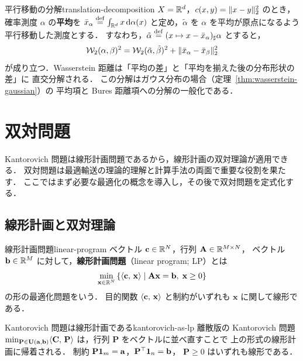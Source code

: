 \begin{remark}{平行移動の分解}{translation-decomposition}
  $X = \mathbb{R}^d$，$c(x,y) = \lVert x - y \rVert_2^2$ のとき，
  確率測度 $\alpha$ の\textbf{平均}を
  $\bar{x}_\alpha \overset{\mathrm{def}}{=} \int_{\mathbb{R}^d} x \, \mathrm{d}\alpha(x)$
  と定め，$\tilde{\alpha}$ を $\alpha$ を平均が原点になるよう平行移動した測度とする．
  すなわち，$\tilde{\alpha} \overset{\mathrm{def}}{=} (x \mapsto x - \bar{x}_\alpha)_\sharp \alpha$ とすると，
  \[
    \mathcal{W}_2(\alpha, \beta)^2
    = \mathcal{W}_2(\tilde{\alpha}, \tilde{\beta})^2
    + \lVert \bar{x}_\alpha - \bar{x}_\beta \rVert_2^2
  \]
  が成り立つ．Wasserstein 距離は「平均の差」と「平均を揃えた後の分布形状の差」に
  直交分解される．
  この分解はガウス分布の場合（定理~\ref{thm:wasserstein-gaussian}）の
  平均項と Bures 距離項への分解の一般化である．
\end{remark}

\section{双対問題}
\label{sec:dual}

Kantorovich 問題は線形計画問題であるから，線形計画の双対理論が適用できる．
双対問題は最適輸送の理論的理解と計算手法の両面で重要な役割を果たす．
ここではまず必要な最適化の概念を導入し，その後で双対問題を定式化する．

\subsection{線形計画と双対理論}
\label{subsec:lp-duality}

\begin{definition}{線形計画問題}{linear-program}
  ベクトル $\mathbf{c} \in \mathbb{R}^N$，行列 $\mathbf{A} \in \mathbb{R}^{M \times N}$，
  ベクトル $\mathbf{b} \in \mathbb{R}^M$ に対して，\textbf{線形計画問題}（linear program; LP）とは
  \[
    \min_{\mathbf{x} \in \mathbb{R}^N} \left\{
    \langle \mathbf{c},\, \mathbf{x} \rangle \;\middle|\;
    \mathbf{A}\mathbf{x} = \mathbf{b}, \; \mathbf{x} \geq 0
    \right\}
  \]
  の形の最適化問題をいう．
  目的関数 $\langle \mathbf{c},\, \mathbf{x} \rangle$ と制約がいずれも $\mathbf{x}$ に関して線形である．
\end{definition}

\begin{remark}{Kantorovich 問題は線形計画である}{kantorovich-as-lp}
  離散版の Kantorovich 問題
  $\min_{\mathbf{P} \in \mathbf{U}(\mathbf{a}, \mathbf{b})} \langle \mathbf{C},\, \mathbf{P} \rangle$
  は，行列 $\mathbf{P}$ をベクトルに並べ直すことで
  上の形式の線形計画に帰着される．
  制約 $\mathbf{P}\mathbf{1}_m = \mathbf{a}$，$\mathbf{P}^\top \mathbf{1}_n = \mathbf{b}$，
  $\mathbf{P} \geq 0$ はいずれも線形である．
\end{remark}

